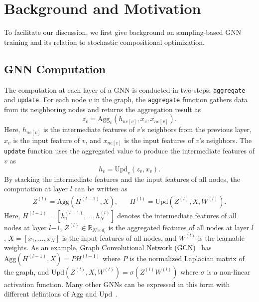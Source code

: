\section{Background and Motivation}
To facilitate our discussion, we first give background on sampling-based GNN training and its relation to stochastic compositional optimization. 

\subsection{GNN Computation}
The computation at each layer of a GNN is conducted in two steps: {\tt aggregate} and {\tt update}. 
For each node $v$ in the graph, the  {\tt aggregate} function gathers data from its neighboring nodes and returns the aggregation result as 
\begin{equation}
    z_v = \mathrm{Agg}_v(h_{ne[v]}, x_v, x_{ne[v]}). 
\end{equation}
Here, $h_{ne[v]}$ is the intermediate features of $v$'s neighbors from the previous layer, $x_v$ is the input feature of $v$, and $x_{ne[v]}$ is the input features of $v$'s neighbors. 
The {\tt update} function uses the aggregated value to produce the intermediate features of $v$ as 
\begin{equation}
    h_v = \mathrm{Upd}_v(z_v, x_v). 
\end{equation}
By stacking the intermediate features and the input features of all nodes, the computation at layer $l$ can be written as 
\begin{equation}
\label{eq:agg_upd}
\begin{split}
Z^{(l)}=\mathrm{Agg}(H^{(l-1)}, X), \;\;\;\;\;\;
H^{(l)} = \mathrm{Upd}(Z^{(l)}, X, W^{(l)}).
\end{split}
\end{equation}
Here, $H^{(l-1)}=[h^{(l-1)}_1,\ldots, h^{(l)}_N]$ denotes the intermediate features of all nodes at layer $l$$-$$1$, $Z^{(l)}\in \mathbb{R}_{N\times d_l}$ is the aggregated features of all nodes at layer $l$, $X = [x_1,\ldots,x_N]$ is the input features of all nodes, and $ W^{(l)}$ is the learnable weights. 
As an example, Graph Convolutional Network (GCN)~\cite{kipf2017semi} has $\mathrm{Agg}(H^{(l-1)}, X)=PH^{(l-1)}$ where $P$ is the normalized Laplacian matrix of the graph, and $\mathrm{Upd}(Z^{(l)},X,  W^{(l)})=\sigma(Z^{(l)} W^{(l)})$ where $\sigma$ is a non-linear activation function.   
Many other GNNs can be expressed in this form with different defintions of $\mathrm{Agg}$ and $\mathrm{Upd}$~\cite{zhou2018graph}. 





